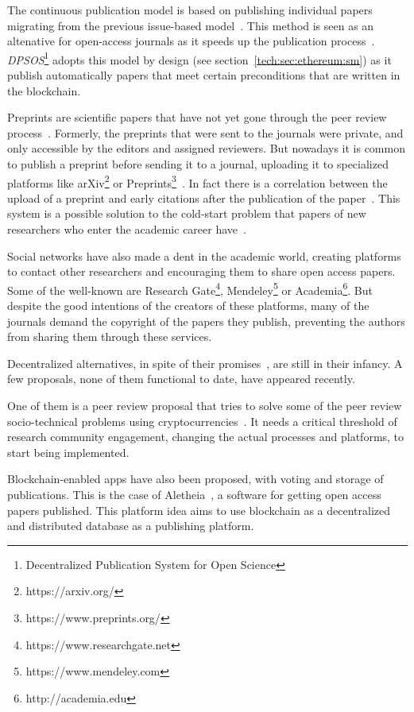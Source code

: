 The continuous publication model is based on publishing individual papers migrating
from the previous issue-based model~\cite{anderton2013continuous}. This method
is seen as an altenative for open-access journals as it speeds up the
publication process~\cite{haymanview}. \emph{DPSOS}\footnote{Decentralized
  Publication System for Open Science} adopts this model by design (see
section~\ref{tech:sec:ethereum:sm}) as it publish automatically papers that
meet certain preconditions that are written in the blockchain.

Preprints are scientific papers that have not yet gone through the peer review
process~\cite{harnad2003electronic}. Formerly, the preprints that were sent to
the journals were private, and only accessible by the editors and assigned
reviewers. But nowadays it is common to publish a preprint before sending it to
a journal, uploading it to specialized platforms like arXiv\footnote{https://arxiv.org/} or Preprints\footnote{https://www.preprints.org/}~\cite{brown2001volution}. In fact there is
a correlation between the upload of a preprint
and early citations after the publication of the
paper~\cite{shuai2012scientific}. This system is a possible solution to the
cold-start problem that papers of new researchers who enter the
academic career have~\cite{sugiyama2010scholarly}.

Social networks have also made a dent in the academic world, creating platforms
to contact other researchers and encouraging them to share open access papers.
Some of the well-known are Research Gate\footnote{https://www.researchgate.net},
Mendeley\footnote{https://www.mendeley.com} or Academia\footnote{http://academia.edu}. But despite the good intentions of the creators
of these platforms, many of the journals demand the copyright of the papers they
publish, preventing the authors from sharing them through these services.


Decentralized alternatives, in spite of their promises~\cite{bartlingblockchain},
are still in their infancy. A few proposals, none of them functional to date,
have appeared recently.

One of them is a peer review proposal that tries to solve some of the peer review socio-technical problems
using cryptocurrencies~\cite{tennant2017multi}. It needs a critical threshold of
research community engagement, changing the actual processes and platforms, to
start being implemented.

Blockchain-enabled apps have also been proposed, with voting and storage of
publications. This is the case of Aletheia~\cite{morton2017aletheia}, a software
for getting open access papers published. This platform idea aims to use
blockchain as a decentralized and distributed database as a publishing platform.

